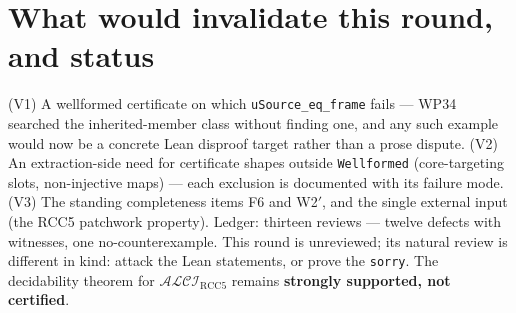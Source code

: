 \documentclass[11pt]{article}
\newcommand{\ALCIRCC}{\mathcal{ALCI}_{\mathrm{RCC5}}}
\newcommand{\code}[1]{\texttt{#1}}
\begin{document}
\section{What would invalidate this round, and status}

(V1) A wellformed certificate on which \code{uSource\_eq\_frame} fails
--- WP34 searched the inherited-member class without finding one, and
any such example would now be a concrete Lean disproof target rather
than a prose dispute.  (V2) An extraction-side need for certificate
shapes outside \code{Wellformed} (core-targeting slots, non-injective
maps) --- each exclusion is documented with its failure mode.  (V3)
The standing completeness items F6 and W2$'$, and the single external
input (the RCC5 patchwork property).  Ledger: thirteen reviews ---
twelve defects with witnesses, one no-counterexample.  This round is
unreviewed; its natural review is different in kind: attack the Lean
statements, or prove the \code{sorry}.  The decidability theorem for
$\ALCIRCC$ remains \textbf{strongly supported, not certified}.
\end{document}
